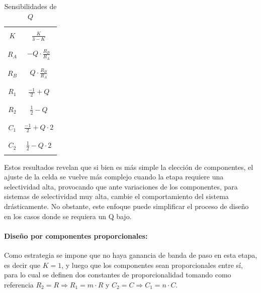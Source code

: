 \begin{table}[H]
    \centering
    \begin{tabular}{c | c}
        \hline \\
        $K$ & $\frac{K}{3 - K}$ \\
        \\ \hline \\
        $R_A$ & $-Q \cdot \frac{R_B}{R_A}$ \\
        \\ \hline \\
        $R_B$ & $Q \cdot \frac{R_B}{R_A}$ \\
        \\ \hline \\
        $R_1$ & $\frac{-1}{2} + Q$ \\
        \\ \hline \\
        $R_2$ & $\frac{1}{2} - Q$ \\
        \\ \hline \\
        $C_1$ & $\frac{-1}{2} + Q \cdot 2$ \\
        \\ \hline \\
        $C_2$ & $\frac{1}{2} - Q \cdot 2$ \\
        \\ \hline
    \end{tabular}
    \caption{Sensibilidades de $Q$}
\end{table}

Estos resultados revelan que si bien es m\'as simple la elecci\'on de componentes, el ajuste de la celda se vuelve m\'as complejo cuando la etapa requiere una selectividad alta,
provocando que ante variaciones de los componentes, para sistemas de selectividad muy alta, cambie el comportamiento del sistema dr\'asticamente. No obstante, este enfoque puede simplificar
el proceso de dise\~no en los casos donde se requiera un Q bajo.

\paragraph{Dise\~no por componentes proporcionales:} Como estrategia se impone que no haya ganancia de banda de paso en esta etapa, es decir que $K = 1$, y luego que los componentes sean proporcionales
entre s\'i, para lo cual se definen dos constantes de proporcionalidad tomando como referencia $R_2 = R \Rightarrow R_1 = m \cdot R$ y $C_2 = C \Rightarrow C_1 = n \cdot C$.

